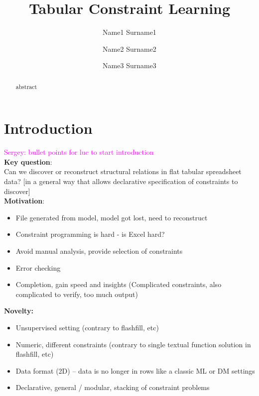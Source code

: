 \documentclass{ecai}
\newcommand{\sergey}[1]{\textcolor{magenta}{{\sc Sergey:} #1}\xspace}
\begin{document}
\title{Tabular Constraint Learning}

\author{Name1 Surname1 \and Name2 Surname2 \and Name3 Surname3  }

\maketitle

\begin{abstract}
  abstract
\end{abstract}
\section{Introduction}
\sergey{bullet points for luc to start introduction}\\
\textbf{Key question}:\\
Can we discover or reconstruct structural relations in flat tabular spreadsheet data? [in a general way that allows declarative specification of constraints to discover]\\


\textbf{Motivation}:
\begin{itemize}
  \item File generated from model, model got lost, need to reconstruct
  \item Constraint programming is hard - is Excel hard?
  \item Avoid manual analysis, provide selection of constraints
  \item Error checking
  \item Completion, gain speed and insights (Complicated constraints, also complicated to verify, too much output)
\end{itemize}

\textbf{Novelty:}
\begin{itemize}
  \item Unsupervised setting (contrary to flashfill, etc)
  \item Numeric, different constraints (contrary to single textual function solution in flashfill, etc)
  \item Data format (2D) -- data is no longer in rows like a classic ML or DM settings
  \item Declarative, general / modular, stacking of constraint problems 
\end{itemize}
\end{document}
